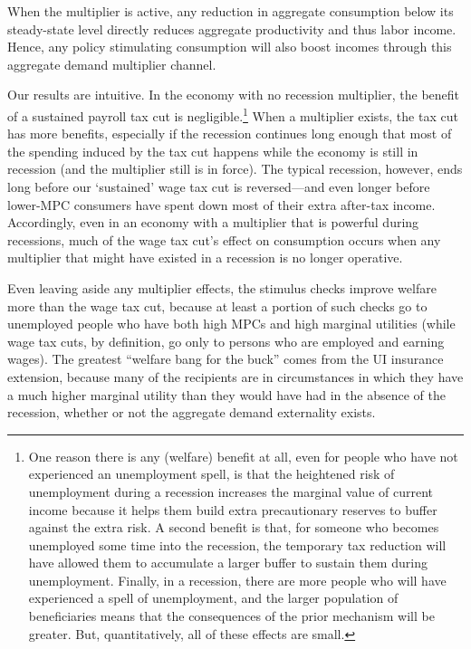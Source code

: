 \documentclass[qe]{econsocart}
\begin{document}

When the multiplier is active, any reduction in aggregate consumption below its steady-state level directly reduces aggregate productivity and thus labor income. Hence, any policy stimulating consumption will also boost incomes through this aggregate demand multiplier channel.

Our results are intuitive.  In the economy with no recession multiplier, the benefit of a sustained payroll tax cut is negligible.\footnote{One reason there is any (welfare) benefit at all, even for people who have not experienced an unemployment spell, is that the heightened risk of unemployment during a recession increases the marginal value of current income because it helps them build extra precautionary reserves to buffer against the extra risk.  A second benefit is that, for someone who becomes unemployed some time into the recession, the temporary tax reduction will have allowed them to accumulate a larger buffer to sustain them during unemployment.  Finally, in a recession, there are more people who will have experienced a spell of unemployment, and the larger population of beneficiaries means that the consequences of the prior mechanism will be greater.  But, quantitatively, all of these effects are small.}
When a multiplier exists, the tax cut has more benefits, especially if the recession continues long enough that most of the spending induced by the tax cut happens while the economy is still in recession (and the multiplier still is in force).  The typical recession, however, ends long before our `sustained' wage tax cut is reversed---and even longer before lower-MPC consumers have spent down most of their extra after-tax income. Accordingly, even in an economy with a multiplier that is powerful during recessions, much of the wage tax cut's effect on consumption occurs when any multiplier that might have existed in a recession is no longer operative.

Even leaving aside any multiplier effects, the stimulus checks improve welfare more than the wage tax cut, because at least a portion of such checks go to unemployed people who have both high MPCs and high marginal utilities (while wage tax cuts, by definition, go only to persons who are employed and earning wages). The greatest ``welfare bang for the buck'' comes from the UI insurance extension, because many of the recipients are in circumstances in which they have a much higher marginal utility than they would have had in the absence of the recession, whether or not the aggregate demand externality exists.
\end{document}
